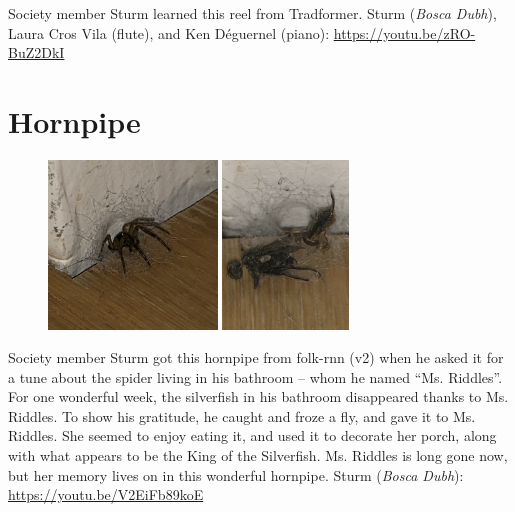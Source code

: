 \documentclass[a4paper,notitlepage,twoside]{book}
\begin{document}
{}
\hypertarget{reel:BeefOut}{}
Society member Sturm learned this reel from Tradformer.
Sturm ({\em Bosca Dubh}), Laura Cros Vila (flute), and Ken Déguernel (piano): \url{https://youtu.be/zRO-BuZ2DkI}


\clearpage
\section{Hornpipe}
{}  
 
\hypertarget{hornpipe:MsRiddles}{}
\begin{figure}
\includegraphics[width=0.4\textwidth]{MsRiddles.png}
\includegraphics[width=0.3\textwidth]{MsRiddles2.png}
\end{figure}
Society member Sturm got this hornpipe from folk-rnn (v2) 
when he asked it for a tune about the spider living in his bathroom – whom he named “Ms. Riddles”.
For one wonderful week, the silverfish in his bathroom disappeared thanks to Ms. Riddles. To show his gratitude, he caught and froze a fly, and gave it to Ms. Riddles. She seemed to enjoy eating it, and used it to decorate her porch, along with what appears to be the King of the Silverfish.
Ms. Riddles is long gone now, but her memory lives on in this wonderful hornpipe.
Sturm ({\em Bosca Dubh}): \url{https://youtu.be/V2EiFb89koE}
\end{document}
